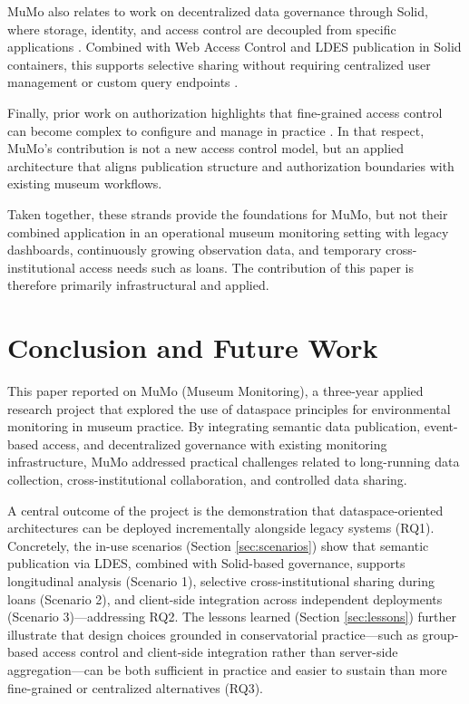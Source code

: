 MuMo also relates to work on decentralized data governance through
Solid, where storage, identity, and access control are decoupled from
specific applications \cite{solid_24, solid_25}. Combined with Web
Access Control and LDES publication in Solid containers, this supports
selective sharing without requiring centralized user management or
custom query endpoints \cite{solidprotocol2022, slabbinck2023linked}.

Finally, prior work on authorization highlights that fine-grained access
control can become complex to configure and manage in practice
\cite{hu2014guide}. In that respect, MuMo's contribution is not a new
access control model, but an applied architecture that aligns
publication structure and authorization boundaries with existing museum
workflows.

Taken together, these strands provide the foundations for MuMo, but not
their combined application in an operational museum monitoring setting
with legacy dashboards, continuously growing observation data, and
temporary cross-institutional access needs such as loans. The
contribution of this paper is therefore primarily infrastructural and
applied.

\section{Conclusion and Future Work}\label{sec:mumo-conclusion}

This paper reported on MuMo (Museum Monitoring), a three-year applied
research project that explored the use of dataspace principles for
environmental monitoring in museum practice. By integrating semantic
data publication, event-based access, and decentralized governance with
existing monitoring infrastructure, MuMo addressed practical challenges
related to long-running data collection, cross-institutional
collaboration, and controlled data sharing.

A central outcome of the project is the demonstration that
dataspace-oriented architectures can be deployed incrementally alongside
legacy systems (RQ1). Concretely, the in-use scenarios (Section
\ref{sec:scenarios}) show that semantic publication via LDES, combined
with Solid-based governance, supports longitudinal analysis (Scenario
1), selective cross-institutional sharing during loans (Scenario 2), and
client-side integration across independent deployments (Scenario
3)---addressing RQ2. The lessons learned (Section \ref{sec:lessons})
further illustrate that design choices grounded in conservatorial
practice---such as group-based access control and client-side
integration rather than server-side aggregation---can be both sufficient
in practice and easier to sustain than more fine-grained or centralized
alternatives (RQ3).

